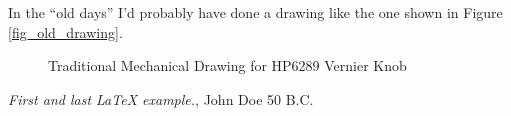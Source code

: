 \documentclass[12pt, twocolumn]{article}
\begin{document}
In the ``old days'' I'd probably have done a drawing like the one
shown in Figure \ref{fig_old_drawing}.

\begin{figure}

\caption{Traditional Mechanical Drawing for HP6289 Vernier Knob}
\end{figure}

\begin{thebibliography}{9}
 \emph{First and last \LaTeX{} example.},
John Doe 50 B.C. 
\end{thebibliography}
\end{document}
